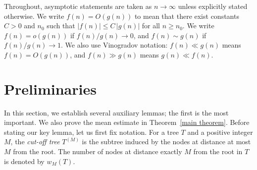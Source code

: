 \documentclass[article]{amsart}
\theoremstyle{definition}
\theoremstyle{remark}
\begin{document}
Throughout, asymptotic statements are taken as $n \to \infty$ unless explicitly stated otherwise. We write $f(n)=O(g(n))$ to mean that there exist constants $C>0$ and $n_0$ such that $|f(n)| \le C\,|g(n)|$ for all $n \ge n_0$. We write $f(n)=o(g(n))$ if $f(n)/g(n) \to 0$, and $f(n) \sim g(n)$ if $f(n)/g(n) \to 1$. We also use Vinogradov notation: $f(n) \ll g(n)$ means $f(n)=O(g(n))$, and $f(n) \gg g(n)$ means $g(n) \ll f(n)$. 
\section{Preliminaries}

In this section, we establish several auxiliary lemmas; the first is the most important. We also prove the mean estimate in Theorem~\ref{main theorem}. Before stating our key lemma, let us first fix notation. For a tree $T$ and a positive integer $M$, the \emph{cut-off tree} $T^{(M)}$ is the subtree induced by the nodes at distance at most $M$ from the root. The number of nodes at distance exactly $M$ from the root in $T$ is denoted by $w_M(T)$.
\end{document}
